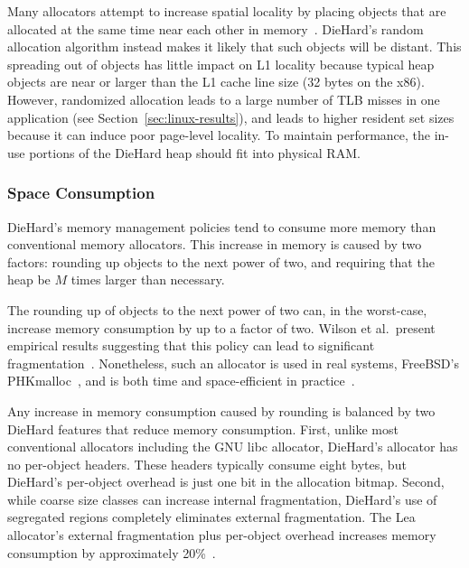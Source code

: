 \documentclass{sig-alternate}
\begin{document}
\noindent
Many allocators attempt to increase spatial locality by placing
objects that are allocated at the same time near each other in
memory~\cite{chil99,feng05,lea97,wils95}. DieHard's random allocation
algorithm instead makes it likely that such objects will be
distant. This spreading out of objects has little impact on L1
locality because typical heap objects are near or larger than the L1
cache line size (32 bytes on the x86). However, randomized allocation
leads to a large number of TLB misses in one application (see
Section~\ref{sec:linux-results}), and leads to higher resident set
sizes because it can induce poor page-level locality. To maintain
performance, the in-use portions of the DieHard heap should fit into
physical RAM.

\subsubsection*{Space Consumption}
\label{sec:space}

\noindent
DieHard's memory management policies tend to consume more memory than
conventional memory allocators. This increase in memory is caused by
two factors: rounding up objects to the next power of two, and
requiring that the heap be $M$ times larger than necessary.

The rounding up of objects to the next power of two can, in the
worst-case, increase memory consumption by up to a factor of
two. Wilson et al.\ present empirical results suggesting that this
policy can lead to significant
fragmentation~\cite{wils95}. Nonetheless, such an allocator is used in
real systems, FreeBSD's PHKmalloc~\cite{phkmalloc}, and is both time
and space-efficient in practice~\cite{feng05}.

Any increase in memory consumption caused by rounding is balanced
by two DieHard features that reduce memory consumption. First,
unlike most conventional allocators including the GNU libc allocator,
DieHard's allocator has no per-object headers. These headers typically
consume eight bytes, but DieHard's per-object overhead is just one bit
in the allocation bitmap. Second, while coarse size classes can
increase internal fragmentation, DieHard's use of segregated regions
completely eliminates external fragmentation. The Lea allocator's
external fragmentation plus per-object overhead increases memory
consumption by approximately 20\%~\cite{feng05}.
\end{document}
